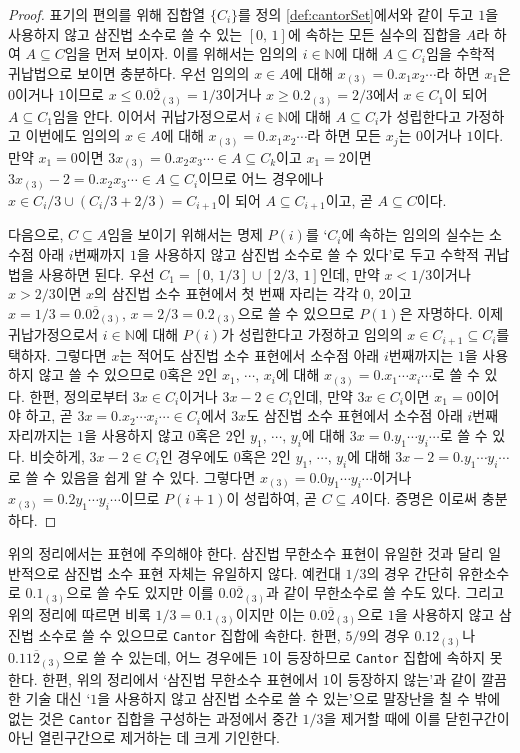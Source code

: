 \begin{proof}
    표기의 편의를 위해 집합열 $\{C_i\}$를 정의 \ref{def:cantorSet}에서와 같이 두고 $1$을 사용하지 않고 삼진법 소수로 쓸 수 있는 $[0,\,1]$에 속하는 모든 실수의 집합을 $A$라 하여 $A\subseteq C$임을 먼저 보이자. 이를 위해서는 임의의 $i\in\mathbb{N}$에 대해 $A\subseteq C_i$임을 수학적 귀납법으로 보이면 충분하다. 우선 임의의 $x\in A$에 대해 $x_{(3)}=0.x_1x_2\cdots$라 하면 $x_1$은 $0$이거나 $1$이므로 $x\leq0.0\overline{2}_{(3)}=1/3$이거나 $x\geq0.2_{(3)}=2/3$에서 $x\in C_1$이 되어 $A\subseteq C_1$임을 안다. 이어서 귀납가정으로서 $i\in\mathbb{N}$에 대해 $A\subseteq C_i$가 성립한다고 가정하고 이번에도 임의의 $x\in A$에 대해 $x_{(3)}=0.x_1x_2\cdots$라 하면 모든 $x_j$는 $0$이거나 $1$이다. 만약 $x_1=0$이면 $3x_{(3)}=0.x_2x_3\cdots\in A\subseteq C_k$이고 $x_1=2$이면 $3x_{(3)}-2=0.x_2x_3\cdots\in A\subseteq C_i$이므로 어느 경우에나 $x\in C_i/3\cup(C_i/3+2/3)=C_{i+1}$이 되어 $A\subseteq C_{i+1}$이고, 곧 $A\subseteq C$이다.

    다음으로, $C\subseteq A$임을 보이기 위해서는 명제 $P(i)$를 `$C_i$에 속하는 임의의 실수는 소수점 아래 $i$번째까지 $1$을 사용하지 않고 삼진법 소수로 쓸 수 있다'로 두고 수학적 귀납법을 사용하면 된다. 우선 $C_1=[0,\,1/3]\cup[2/3,\,1]$인데, 만약 $x<1/3$이거나 $x>2/3$이면 $x$의 삼진법 소수 표현에서 첫 번째 자리는 각각 $0,\,2$이고 $x=1/3=0.0\overline{2}_{(3)},\,x=2/3=0.2_{(3)}$으로 쓸 수 있으므로 $P(1)$은 자명하다. 이제 귀납가정으로서 $i\in\mathbb{N}$에 대해 $P(i)$가 성립한다고 가정하고 임의의 $x\in C_{i+1}\subseteq C_i$를 택하자. 그렇다면 $x$는 적어도 삼진법 소수 표현에서 소수점 아래 $i$번째까지는 $1$을 사용하지 않고 쓸 수 있으므로 $0$혹은 $2$인 $x_1,\,\cdots,\,x_i$에 대해 $x_{(3)}=0.x_1\cdots x_i\cdots$로 쓸 수 있다. 한편, 정의로부터 $3x\in C_i$이거나 $3x-2\in C_i$인데, 만약 $3x\in C_i$이면 $x_1=0$이어야 하고, 곧 $3x=0.x_2\cdots x_i\cdots\in C_i$에서 $3x$도 삼진법 소수 표현에서 소수점 아래 $i$번째 자리까지는 $1$을 사용하지 않고 $0$혹은 $2$인 $y_1,\,\cdots,\,y_i$에 대해 $3x=0.y_1\cdots y_i\cdots$로 쓸 수 있다. 비슷하게, $3x-2\in C_i$인 경우에도 $0$혹은 $2$인 $y_1,\,\cdots,\,y_i$에 대해 $3x-2=0.y_1\cdots y_i\cdots$로 쓸 수 있음을 쉽게 알 수 있다. 그렇다면 $x_{(3)}=0.0y_1\cdots y_i\cdots$이거나 $x_{(3)}=0.2y_1\cdots y_i\cdots$이므로 $P(i+1)$이 성립하여, 곧 $C\subseteq A$이다. 증명은 이로써 충분하다.
\end{proof}

위의 정리에서는 표현에 주의해야 한다. 삼진법 무한소수 표현이 유일한 것과 달리 일반적으로 삼진법 소수 표현 자체는 유일하지 않다. 예컨대 $1/3$의 경우 간단히 유한소수로 $0.1_{(3)}$으로 쓸 수도 있지만 이를 $0.0\overline{2}_{(3)}$과 같이 무한소수로 쓸 수도 있다. 그리고 위의 정리에 따르면 비록 $1/3=0.1_{(3)}$이지만 이는 $0.0\overline{2}_{(3)}$으로 $1$을 사용하지 않고 삼진법 소수로 쓸 수 있으므로 \texttt{Cantor} 집합에 속한다. 한편, $5/9$의 경우 $0.12_{(3)}$나 $0.11\overline{2}_{(3)}$으로 쓸 수 있는데, 어느 경우에든 $1$이 등장하므로 \texttt{Cantor} 집합에 속하지 못한다. 한편, 위의 정리에서 `삼진법 무한소수 표현에서 $1$이 등장하지 않는'과 같이 깔끔한 기술 대신 `$1$을 사용하지 않고 삼진법 소수로 쓸 수 있는'으로 말장난을 칠 수 밖에 없는 것은 \texttt{Cantor} 집합을 구성하는 과정에서 중간 $1/3$을 제거할 때에 이를 닫힌구간이 아닌 열린구간으로 제거하는 데 크게 기인한다.

